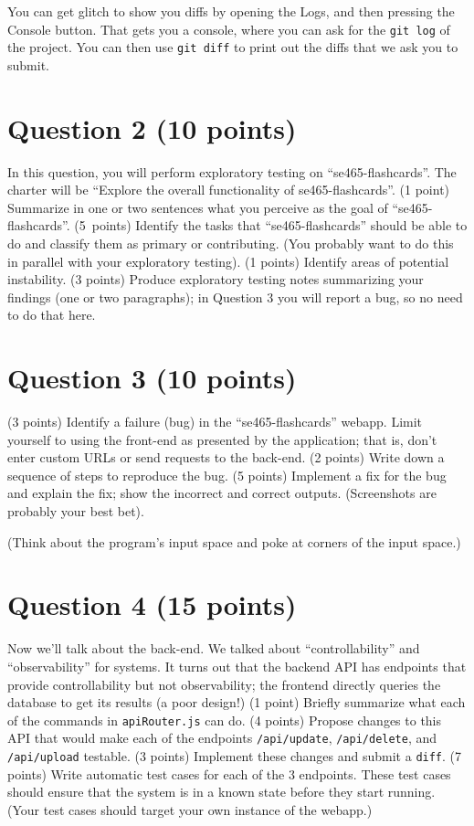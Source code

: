 \documentclass[10pt,hidelinks]{article}
\begin{document}
You can get glitch to show you diffs by opening the Logs, and then
pressing the Console button. That gets you a console, where you can
ask for the {\tt git log} of the project. You can then use {\tt git diff}
to print out the diffs that we ask you to submit.

\section*{Question 2 (10 points)}
In this question, you will perform exploratory testing on ``se465-flashcards''.
The charter will be ``Explore the overall functionality of
se465-flashcards''. (1 point) Summarize in one or two sentences what you
perceive as the goal of ``se465-flashcards''. (5~points) Identify the tasks
that ``se465-flashcards'' should be able to do and classify them as primary or
contributing. (You probably want to do this in parallel with your
exploratory testing). (1 points) Identify areas of potential
instability. (3 points) Produce exploratory testing notes summarizing
your findings (one or two paragraphs); in Question 3 you will report a
bug, so no need to do that here.

\section*{Question 3 (10 points)}
(3 points) Identify a failure (bug) in the ``se465-flashcards'' webapp.
Limit yourself to using the front-end as presented by the application; that is,
don't enter custom URLs or send requests to the back-end.
(2 points) Write down a sequence of
steps to reproduce the bug. (5 points) Implement a fix for the bug and explain the
fix; show the incorrect and correct outputs. (Screenshots are probably
your best bet).

(Think about the program's input space and poke at corners of the
input space.)

\section*{Question 4 (15 points)}
Now we'll talk about the back-end. We talked about ``controllability''
and ``observability'' for systems.  It turns out that the backend API
has endpoints that provide controllability but not observability; the
frontend directly queries the database to get its results (a poor
design!)  (1 point) Briefly summarize what each of the commands in
{\tt apiRouter.js} can do. (4 points) Propose changes to this API that
would make each of the endpoints {\tt /api/update}, {\tt /api/delete},
and {\tt /api/upload} testable. (3 points) Implement these changes and
submit a {\tt diff}.
(7 points) Write automatic test cases for each of the 3 endpoints.
These test cases should ensure that the system is in a known state
before they start running. (Your test cases should target your own instance
of the webapp.)
\end{document}
